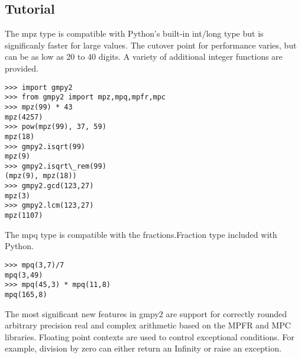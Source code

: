 \subsection{Tutorial}

The mpz type is compatible with Python's built-in int/long type but is significanly faster for
large values. The cutover point for performance varies, but can be as low as 20 to 40 digits.
A variety of additional integer functions are provided.

\begin{lstlisting}
>>> import gmpy2
>>> from gmpy2 import mpz,mpq,mpfr,mpc
>>> mpz(99) * 43
mpz(4257)
>>> pow(mpz(99), 37, 59)
mpz(18)
>>> gmpy2.isqrt(99)
mpz(9)
>>> gmpy2.isqrt\_rem(99)
(mpz(9), mpz(18))
>>> gmpy2.gcd(123,27)
mpz(3)
>>> gmpy2.lcm(123,27)
mpz(1107)
\end{lstlisting}

The mpq type is compatible with the fractions.Fraction type included with Python.

\begin{lstlisting}
>>> mpq(3,7)/7
mpq(3,49)
>>> mpq(45,3) * mpq(11,8)
mpq(165,8)
\end{lstlisting}

The most significant new features in gmpy2 are support for correctly rounded arbitrary
precision real and complex arithmetic based on the MPFR and MPC libraries. Floating point
contexts are used to control exceptional conditions. For example, division by zero can either return an Infinity or raise an exception.

